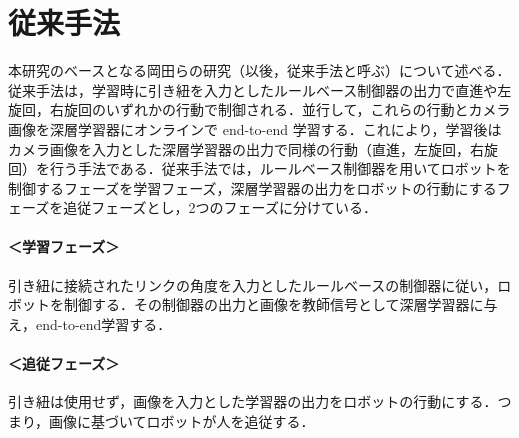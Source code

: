 \chapter{従来手法}

  本研究のベースとなる岡田らの研究（以後，従来手法と呼ぶ）について述べる．従来手法は，学習時に引き紐を入力としたルールベース制御器の出力で直進や左旋回，右旋回のいずれかの行動で制御される．並行して，これらの行動とカメラ画像を深層学習器にオンラインで end-to-end 学習する．これにより，学習後はカメラ画像を入力とした深層学習器の出力で同様の行動（直進，左旋回，右旋回）を行う手法である．従来手法では，ルールベース制御器を用いてロボットを制御するフェーズを学習フェーズ，深層学習器の出力をロボットの行動にするフェーズを追従フェーズとし，2つのフェーズに分けている．

  \subsubsection*{＜学習フェーズ＞}
  引き紐に接続されたリンクの角度を入力としたルールベースの制御器に従い，ロボットを制御する．その制御器の出力と画像を教師信号として深層学習器に与え，end-to-end学習する．
  
  \subsubsection*{＜追従フェーズ＞}
  引き紐は使用せず，画像を入力とした学習器の出力をロボットの行動にする．つまり，画像に基づいてロボットが人を追従する．

\newpage

\label{chap:trajectory}
%





%
